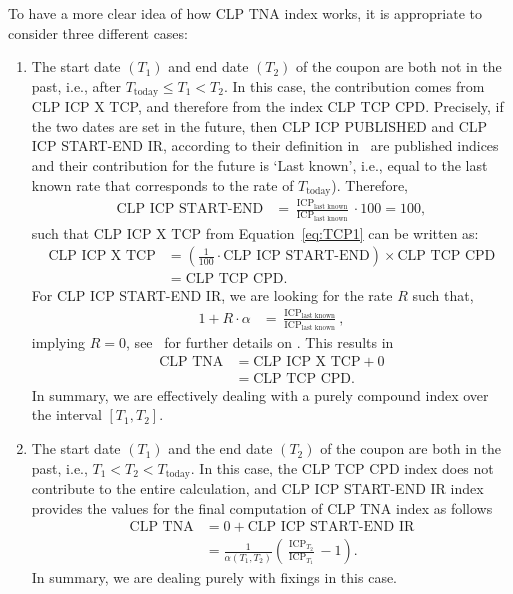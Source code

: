 \documentclass[]{pmv_report} %
\DeclareMathOperator{\ICP}{ICP}
\begin{document}
To have a more clear idea of how CLP TNA index works, it is appropriate to consider three different cases:
\begin{enumerate}
  \item The start date $(T_1)$ and end date $(T_2)$ of the coupon are both not in the past, i.e., after $T_{\text{today}} \leq T_1 < T_2$.
    In this case, the contribution comes from CLP ICP X TCP, and therefore from the  index CLP TCP CPD.
    Precisely, if the two dates are set in the future, then CLP ICP PUBLISHED and CLP ICP START-END IR, according to their definition in~\cite[Section 3.6.1]{Mx.StaticDataObjects} are published indices and their contribution for the future is `Last known', i.e., equal to the last known rate that corresponds to the rate of $T_{\text{today}}$).
    Therefore,
    \begin{align}
      \text{CLP ICP START-END}
        &= \frac{\ICP_{\text{last known}}}{\ICP_{\text{last known}}} \cdot 100 = 100, \nonumber
    \end{align}
    such that CLP ICP X TCP from Equation~\eqref{eq:TCP1} can be written as:
    \begin{align}
      \text{CLP ICP X TCP}
        &= \left(\frac{1}{100} \cdot \text{CLP ICP START-END} \right) \times \text{CLP TCP CPD} \nonumber \\
        &= \text{CLP TCP CPD}. \nonumber
    \end{align}
    For CLP ICP START-END IR, we are looking for the rate $R$ such that,
    \begin{align}
      1 + R \cdot \alpha
        &= \frac{\ICP_{\text{last known}}}{\ICP_{\text{last known}}}, \nonumber
    \end{align}
    implying $R=0$, see~\cite[Section 3.6.1]{Mx.StaticDataObjects} for further details on .
    This results in
    \begin{align}
      \text{CLP TNA}
        &= \text{CLP ICP X TCP} + 0 \nonumber \\
        &= \text{CLP TCP CPD}. \nonumber
    \end{align}
    In summary, we are effectively dealing with a purely compound index over the interval $[T_1, T_2]$.

  \item The start date $(T_1)$ and the end date $(T_2)$ of the coupon are both in the past, i.e., $T_1 < T_2 < T_{\text{today}}$.
    In this case, the CLP TCP CPD index does not contribute to the entire calculation, and CLP ICP START-END IR index provides the values for the final computation of CLP TNA index as follows
    \begin{align}
      \text{CLP TNA}
        &= 0 + \text{CLP ICP START-END IR} \nonumber \\
        &= \frac{1}{\alpha(T_1,T_2)}\left(\frac{\ICP_{T_2}}{\ICP_{T_1}} - 1\right). \nonumber
    \end{align}
    In summary, we are dealing purely with fixings in this case.


\end{enumerate}
\end{document}
